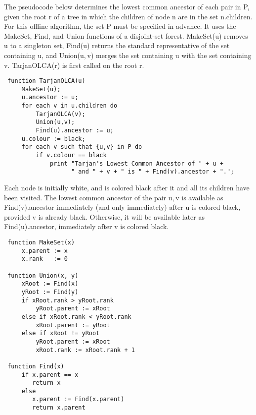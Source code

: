 The pseudocode below determines the lowest common ancestor of each pair in P, given the root r of a tree in which the children of node n are in the set n.children. For this offline algorithm, the set P must be specified in advance. It uses the MakeSet, Find, and Union functions of a disjoint-set forest. MakeSet(u) removes u to a singleton set, Find(u) returns the standard representative of the set containing u, and Union(u, v) merges the set containing u with the set containing v. TarjanOLCA(r) is first called on the root r.
\begin{verbatim}
 function TarjanOLCA(u)
     MakeSet(u);
     u.ancestor := u;
     for each v in u.children do
         TarjanOLCA(v);
         Union(u,v);
         Find(u).ancestor := u;
     u.colour := black;
     for each v such that {u,v} in P do
         if v.colour == black
             print "Tarjan's Lowest Common Ancestor of " + u +
                   " and " + v + " is " + Find(v).ancestor + ".";
\end{verbatim}
Each node is initially white, and is colored black after it and all its children have been visited. The lowest common ancestor of the pair {u, v} is available as Find(v).ancestor immediately (and only immediately) after u is colored black, provided v is already black. Otherwise, it will be available later as Find(u).ancestor, immediately after v is colored black.
\begin{verbatim}
 function MakeSet(x)
     x.parent := x
     x.rank   := 0
 
 function Union(x, y)
     xRoot := Find(x)
     yRoot := Find(y)
     if xRoot.rank > yRoot.rank
         yRoot.parent := xRoot
     else if xRoot.rank < yRoot.rank
         xRoot.parent := yRoot
     else if xRoot != yRoot
         yRoot.parent := xRoot
         xRoot.rank := xRoot.rank + 1
  
 function Find(x)
     if x.parent == x
        return x
     else
        x.parent := Find(x.parent)
        return x.parent
\end{verbatim}
